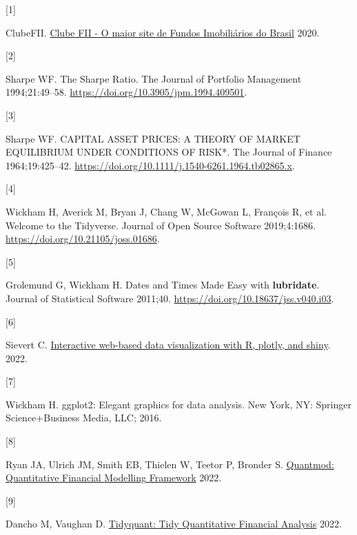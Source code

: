 \documentclass[
]{article}
\newlength{\cslhangindent}
\newlength{\csllabelwidth}
\newlength{\cslentryspacingunit} %
\newenvironment{CSLReferences}[2] %
 {%
  \setlength{\parindent}{0pt}
  \ifodd #1
  \let\oldpar\par
  \def\par{\hangindent=\cslhangindent\oldpar}
  \fi
  \setlength{\parskip}{#2\cslentryspacingunit}
 }%
 {}
\newcommand{\CSLLeftMargin}[1]{\parbox[t]{\csllabelwidth}{#1}}
\newcommand{\CSLRightInline}[1]{\parbox[t]{\linewidth - \csllabelwidth}{#1}\break}
\begin{document}
\hypertarget{refs}{}
\begin{CSLReferences}{0}{0}
\leavevmode{}%
\CSLLeftMargin{{[}1{]} }%
\CSLRightInline{ClubeFII. \href{https://www.clubefii.com.br}{Clube FII -
O maior site de Fundos Imobiliários do Brasil} 2020.}

\leavevmode{}%
\CSLLeftMargin{{[}2{]} }%
\CSLRightInline{Sharpe WF. The Sharpe Ratio. The Journal of Portfolio
Management 1994;21:49--58.
\url{https://doi.org/10.3905/jpm.1994.409501}.}

\leavevmode{}%
\CSLLeftMargin{{[}3{]} }%
\CSLRightInline{Sharpe WF. CAPITAL ASSET PRICES: A THEORY OF MARKET
EQUILIBRIUM UNDER CONDITIONS OF RISK*. The Journal of Finance
1964;19:425--42.
\url{https://doi.org/10.1111/j.1540-6261.1964.tb02865.x}.}

\leavevmode{}%
\CSLLeftMargin{{[}4{]} }%
\CSLRightInline{Wickham H, Averick M, Bryan J, Chang W, McGowan L,
François R, et al. Welcome to the {Tidyverse}. Journal of Open Source
Software 2019;4:1686. \url{https://doi.org/10.21105/joss.01686}.}

\leavevmode{}%
\CSLLeftMargin{{[}5{]} }%
\CSLRightInline{Grolemund G, Wickham H. Dates and {Times} {Made} {Easy}
with \textbf{lubridate}. Journal of Statistical Software 2011;40.
\url{https://doi.org/10.18637/jss.v040.i03}.}

\leavevmode{}%
\CSLLeftMargin{{[}6{]} }%
\CSLRightInline{Sievert C. \href{https://plotly-r.com/}{Interactive
web-based data visualization with {R}, plotly, and shiny}. 2022.}

\leavevmode{}%
\CSLLeftMargin{{[}7{]} }%
\CSLRightInline{Wickham H. ggplot2: Elegant graphics for data analysis.
New York, NY: Springer Science+Business Media, LLC; 2016.}

\leavevmode{}%
\CSLLeftMargin{{[}8{]} }%
\CSLRightInline{Ryan JA, Ulrich JM, Smith EB, Thielen W, Teetor P,
Bronder S. \href{https://CRAN.R-project.org/package=quantmod}{Quantmod:
{Quantitative} {Financial} {Modelling} {Framework}} 2022.}

\leavevmode{}%
\CSLLeftMargin{{[}9{]} }%
\CSLRightInline{Dancho M, Vaughan D.
\href{https://CRAN.R-project.org/package=tidyquant}{Tidyquant: {Tidy}
{Quantitative} {Financial} {Analysis}} 2022.}


\end{CSLReferences}
\end{document}
